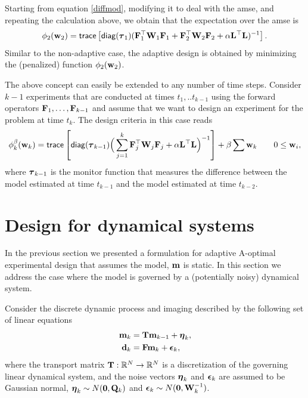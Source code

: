 \documentclass[11pt]{article}
\begin{document}
Starting from  equation \eqref{diffmod}, modifying it to deal with the {\sf amse}, and repeating the calculation above, we obtain that the expectation 
over the {\sf amse} is
\begin{align}
\label{design2ad}
\phi_{2}({\bf{w}}_{2}) =  {\sf trace} \left[  {\sf diag}({\boldsymbol \tau}_1) ({\bf{F}}_{1}^{\top}{\bf{W}}_{1}{\bf{F}}_{1}   + {\bf{F}}_{2}^{\top}{\bf{W}}_{2}{\bf{F}}_{2} +
\alpha {\bf{L}}^{\top}{\bf{L}})^{-1} \right]. 
\end{align}
Similar to the non-adaptive case, the adaptive design is obtained by minimizing the (penalized) 
function $\phi_{2}({\bf{w}}_{2})$.

\bigskip

The above concept can  easily be extended to any number of time steps.
Consider $k-1$ experiments that are conducted at times $t_1,..t_{k-1}$ using
the forward operators ${\bf{F}}_{1},\ldots,{\bf{F}}_{k-1}$ and assume that we want to design an experiment 
for the problem at time $t_{k}$. The design criteria in this case reads
\begin{align}
\label{amsek}
\phi_{k}^{\beta}({\bf{w}}_{k}) =  {\sf trace} \left[  {\sf diag}({\boldsymbol \tau}_{k-1}) \Big(\sum_{j=1}^{k}{\bf{F}}_{j}^{\top}{\bf{W}}_{j}{\bf{F}}_{j}   +
\alpha {\bf{L}}^{\top}{\bf{L}}\Big)^{-1} \right] + \beta \sum {\bf{w}}_{k}\quad \quad 0 \le {\bf{w}}_i, 
\end{align}
where ${\boldsymbol \tau}_{k-1}$ is the monitor function that measures the difference between the model estimated
at time $t_{k-1}$ and the model estimated at time $t_{k-2}$.


\section{Design for dynamical systems}
\label{sec:Dynamic}
In the previous section we presented a formulation for adaptive A-optimal experimental 
design that assumes  the model, ${\bf{m}}$
is static. 
In this section we address the case where the model is governed by a (potentially noisy)
dynamical system.

Consider the discrete  dynamic process and imaging  described  by the following set of linear equations
\begin{subequations}
\begin{align}
\label{eq:dynamic}
{\bf{m}} _k&= {\bf{T}}{\bf{m}}_{k-1} + {{\boldsymbol \eta}}_k,\\
\label{eq:image}
{\bf{d}}_k &= {\bf{F}} {\bf{m}}_k + {{\boldsymbol \epsilon}}_k,
\end{align}  
\end{subequations}
where the transport matrix ${\bf{T}}: \mathbb{R}^{N} \rightarrow \mathbb{R}^{N}$  is
 a discretization of the governing linear dynamical  system, and the noise vectors ${\boldsymbol \eta}_k $ and ${\boldsymbol \epsilon}_k $ are assumed to be Gaussian normal, ${\boldsymbol \eta}_k \sim N({\bf 0},{\bf{Q}}_k)$ and ${{\boldsymbol \epsilon}_k} \sim N({\bf 0},{\bf{W}}^{-1}_k)$.
\end{document}
